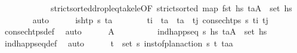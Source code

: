 \begin{isabellebody}
\ \ \ \ \ \ \ \ \ \ \ \ strict{\isacharunderscore}{\kern0pt}sorted{\isacharunderscore}{\kern0pt}drop{\isacharunderscore}{\kern0pt}leq{\isacharunderscore}{\kern0pt}take{\isacharunderscore}{\kern0pt}le{\isacharbrackleft}{\kern0pt}OF\ {\isacartoucheopen}strict{\isacharunderscore}{\kern0pt}sorted\ {\isacharparenleft}{\kern0pt}map\ fst\ hs{\isacharparenright}{\kern0pt}{\isacartoucheclose}\ {\isacartoucheopen}{\isacharparenleft}{\kern0pt}t\isactrlsub a{\isacharcomma}{\kern0pt}A{\isacharparenright}{\kern0pt}\ {\isasymin}\ set\ hs{\isacartoucheclose}{\isacharbrackright}{\kern0pt}\isanewline
\ \ \ \ \ \ \isamarkupfalse%
\ auto\isanewline
\ \ \ \ \isamarkupfalse%
\ {\isachardoublequoteopen}{\isasymnot}is{\isacharunderscore}{\kern0pt}htp\ {\isasympi}s\ t\isactrlsub a{\isachardoublequoteclose}\isanewline
\ \ \ \ \ \ \isamarkupfalse%
\ {\isacartoucheopen}t\isactrlsub i\ {\isacharless}{\kern0pt}\ t\isactrlsub a\ {\isasymand}\ t\isactrlsub a\ {\isacharless}{\kern0pt}\ t\isactrlsub j{\isacartoucheclose}\ {\isacartoucheopen}consec{\isacharunderscore}{\kern0pt}htps\ {\isasympi}s\ t\isactrlsub i\ t\isactrlsub j{\isacartoucheclose}\ \isamarkupfalse%
\ consec{\isacharunderscore}{\kern0pt}htps{\isacharunderscore}{\kern0pt}def\ \isamarkupfalse%
\ auto\isanewline
\ \ \ \ \isamarkupfalse%
\ {\isachardoublequoteopen}A\ {\isasymnoteq}\ {\isacharbrackleft}{\kern0pt}{\isacharbrackright}{\kern0pt}{\isachardoublequoteclose}\isanewline
\ \ \ \ \ \ \isamarkupfalse%
\ {\isacartoucheopen}ind{\isacharunderscore}{\kern0pt}happ{\isacharunderscore}{\kern0pt}seq\ {\isasympi}s\ hs{\isacartoucheclose}\ {\isacartoucheopen}{\isacharparenleft}{\kern0pt}t\isactrlsub a{\isacharcomma}{\kern0pt}A{\isacharparenright}{\kern0pt}\ {\isasymin}\ set\ hs{\isacartoucheclose}\ \isamarkupfalse%
\ ind{\isacharunderscore}{\kern0pt}happ{\isacharunderscore}{\kern0pt}seq{\isacharunderscore}{\kern0pt}def\ \isamarkupfalse%
\ auto\isanewline
\ \ \ \ \isamarkupfalse%
\ {\isachardoublequoteopen}{\isasymexists}{\isacharparenleft}{\kern0pt}t\isactrlsub {\isasympi}{\isacharcomma}{\kern0pt}{\isasympi}{\isacharparenright}{\kern0pt}\ {\isasymin}\ set\ {\isasympi}s{\isachardot}{\kern0pt}\ inst{\isacharunderscore}{\kern0pt}of{\isacharunderscore}{\kern0pt}plan{\isacharunderscore}{\kern0pt}action\ {\isasympi}s\ {\isacharparenleft}{\kern0pt}t\isactrlsub {\isasympi}{\isacharcomma}{\kern0pt}{\isasympi}{\isacharparenright}{\kern0pt}\ {\isacharparenleft}{\kern0pt}t\isactrlsub a{\isacharcomma}{\kern0pt}a{\isacharparenright}{\kern0pt}{\isachardoublequoteclose}\isanewline

\end{isabellebody}

